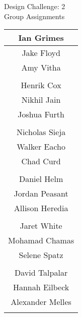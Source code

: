 \documentclass{article}
\begin{document}
\renewcommand{\arraystretch}{1.2} 
\begin{center}
{\Large Design Challenge: 2\\ 
Group Assignments} \\ 
\begin{tabular}{|c|} \hline 
 Ian Grimes\\ \hline 
 Jake Floyd\\ \hline 
 Amy Vitha\\ \hline 
\multicolumn{1}{c}{\vspace{1mm}} \\ 
\hline 
Henrik Cox \\ \hline 
 Nikhil Jain\\ \hline 
 Joshua Furth\\ \hline 
\multicolumn{1}{c}{\vspace{1mm}} \\ 
\hline 
 Nicholas Sieja\\ \hline 
 Walker Eacho\\ \hline 
 Chad Curd\\ \hline 
\multicolumn{1}{c}{\vspace{1mm}} \\ 
\hline 
 Daniel Helm\\ \hline 
 Jordan Peasant\\ \hline 
 Allison Heredia\\ \hline 
\multicolumn{1}{c}{\vspace{1mm}} \\ 
\hline 
 Jaret White\\ \hline 
 Mohamad Chamas\\ \hline 
 Selene Spatz\\ \hline 
\multicolumn{1}{c}{\vspace{1mm}} \\ 
\hline 
 David Talpalar\\ \hline 
 Hannah Eilbeck\\ \hline 
 Alexander Melles\\ \hline 
\multicolumn{1}{c}{\vspace{1mm}} \\ 

\end{tabular} \\ 
\end{center}
\end{document}
